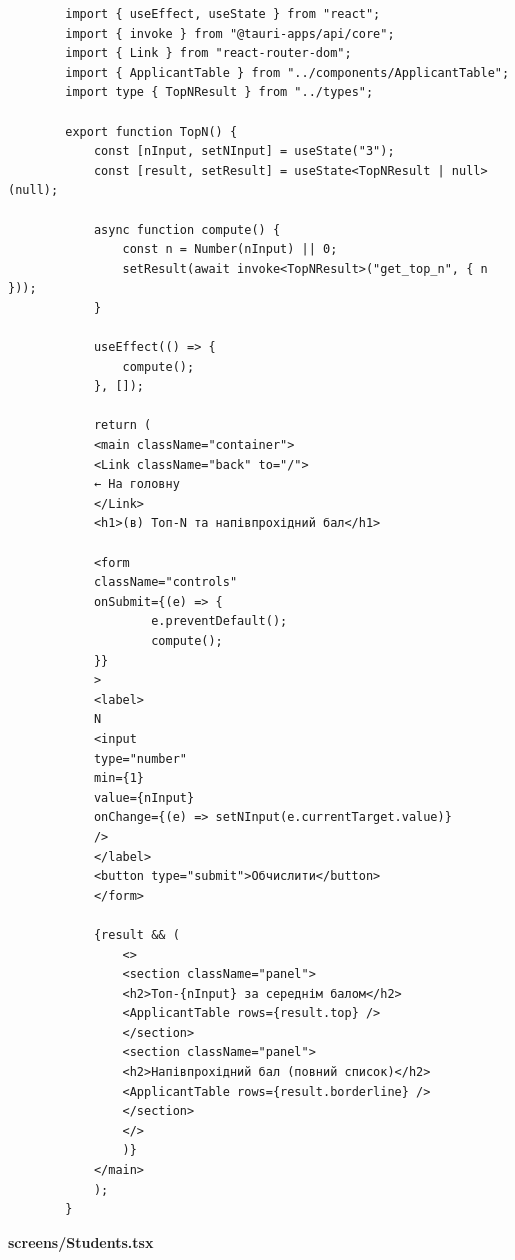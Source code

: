 \documentclass[14pt, a4paper]{extreport}
\begin{document}
	\begin{verbatim}
		import { useEffect, useState } from "react";
		import { invoke } from "@tauri-apps/api/core";
		import { Link } from "react-router-dom";
		import { ApplicantTable } from "../components/ApplicantTable";
		import type { TopNResult } from "../types";

		export function TopN() {
			const [nInput, setNInput] = useState("3");
			const [result, setResult] = useState<TopNResult | null>(null);

			async function compute() {
				const n = Number(nInput) || 0;
				setResult(await invoke<TopNResult>("get_top_n", { n }));
			}

			useEffect(() => {
				compute();
			}, []);

			return (
			<main className="container">
			<Link className="back" to="/">
			← На головну
			</Link>
			<h1>(в) Топ-N та напівпрохідний бал</h1>

			<form
			className="controls"
			onSubmit={(e) => {
					e.preventDefault();
					compute();
			}}
			>
			<label>
			N
			<input
			type="number"
			min={1}
			value={nInput}
			onChange={(e) => setNInput(e.currentTarget.value)}
			/>
			</label>
			<button type="submit">Обчислити</button>
			</form>

			{result && (
				<>
				<section className="panel">
				<h2>Топ-{nInput} за середнім балом</h2>
				<ApplicantTable rows={result.top} />
				</section>
				<section className="panel">
				<h2>Напівпрохідний бал (повний список)</h2>
				<ApplicantTable rows={result.borderline} />
				</section>
				</>
				)}
			</main>
			);
		}
	\end{verbatim}

	\textbf{screens/Students.tsx}
\end{document}
